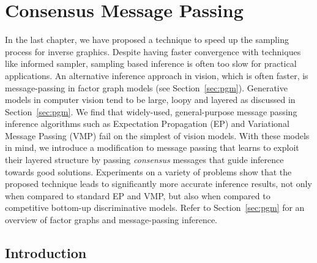 \chapter{Consensus Message Passing}
\label{chap:cmp}


\newcommand{\METHOD}{Consensus Message Passing\@\xspace}
\newcommand{\Method}{Consensus message passing\@\xspace}
\newcommand{\method}{consensus message passing\@\xspace}
\newcommand{\MTD}{CMP\@\xspace}

\makeatletter
\renewcommand{\thesubfigure}{\alph{subfigure}}
\renewcommand{\@thesubfigure}{(\thesubfigure)\hskip\subfiglabelskip}
\makeatother

In the last chapter, we have proposed a technique to speed up the sampling process
for inverse graphics. Despite having faster convergence with techniques
like informed sampler, sampling based inference is often too slow for practical applications.
An alternative inference approach in vision, which is often faster, is
message-passing in factor graph models (see Section~\ref{sec:pgm}).
Generative models in computer vision tend to be large, loopy and layered as discussed in Section~\ref{sec:pgm}.
We find that widely-used, general-purpose message passing inference algorithms such as Expectation Propagation (EP) and Variational Message Passing (VMP) fail on the simplest of vision models. With these models in mind, we introduce a modification to message passing that learns to exploit their layered structure by passing \textit{consensus} messages that guide inference towards good solutions. Experiments on a variety of problems show that the proposed technique leads to significantly more accurate inference results, not only when compared to standard EP and VMP, but also when compared to competitive bottom-up discriminative models. Refer to Section~\ref{sec:pgm} for an overview
of factor graphs and message-passing inference.


\section{Introduction}
\label{sec:introduction}

